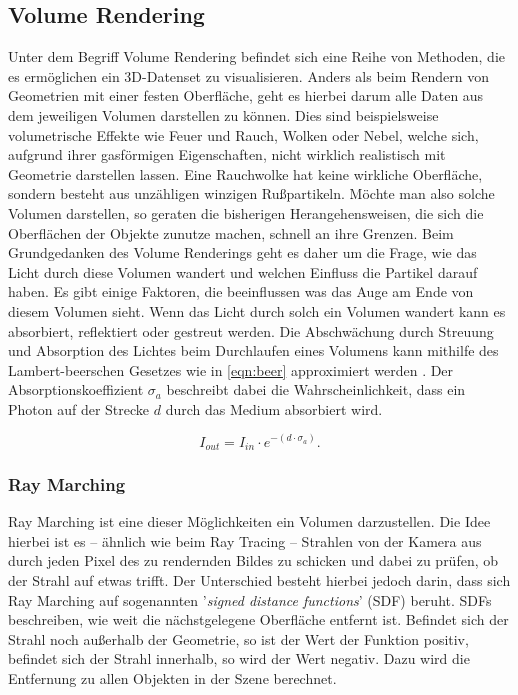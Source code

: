 \newpage
\subsection{Volume Rendering}

Unter dem Begriff Volume Rendering befindet sich eine Reihe von Methoden, die es ermöglichen ein 3D-Datenset zu visualisieren.
Anders als beim Rendern von Geometrien mit einer festen Oberfläche, geht es hierbei darum alle Daten aus
dem jeweiligen Volumen darstellen zu können. Dies sind beispielsweise volumetrische Effekte wie Feuer und Rauch, Wolken oder Nebel,
welche sich, aufgrund ihrer gasförmigen Eigenschaften, nicht wirklich realistisch mit Geometrie darstellen lassen.
Eine Rauchwolke hat keine wirkliche Oberfläche, sondern besteht aus unzähligen winzigen Rußpartikeln.
Möchte man also solche Volumen darstellen, so geraten die bisherigen Herangehensweisen, die sich die Oberflächen der Objekte zunutze machen,
schnell an ihre Grenzen. Beim Grundgedanken des Volume Renderings geht es daher um die Frage, wie das Licht durch diese Volumen
wandert und welchen Einfluss die Partikel darauf haben.
Es gibt einige Faktoren, die beeinflussen was das Auge am Ende von diesem Volumen sieht. Wenn das Licht durch solch ein Volumen wandert
kann es absorbiert, reflektiert oder gestreut werden.
Die Abschwächung durch Streuung und Absorption des Lichtes beim Durchlaufen eines Volumens kann mithilfe des Lambert-beerschen Gesetzes wie in \autoref{eqn:beer} 
approximiert werden \parencite{Mayerhofer2020}. 
Der Absorptionskoeffizient $\sigma_a$ beschreibt dabei die Wahrscheinlichkeit, dass ein Photon auf der Strecke $d$ durch das Medium absorbiert wird. 

\vspace{-0.5cm  }
\begin{equation} 
    \label{eqn:beer}
    I_{out} = I_{in} \cdot e^{- ( d \cdot\sigma_a  )}.
\end{equation}




\subsubsection{Ray Marching}

Ray Marching ist eine dieser Möglichkeiten ein Volumen darzustellen. Die Idee hierbei ist es – ähnlich wie beim Ray Tracing – 
Strahlen von der Kamera aus durch jeden Pixel des zu rendernden Bildes zu schicken und dabei zu prüfen, ob der Strahl auf etwas trifft.
Der Unterschied besteht hierbei jedoch darin, dass sich Ray Marching auf sogenannten '\textit{signed distance functions}' (SDF) beruht.
SDFs beschreiben, wie weit die nächstgelegene Oberfläche entfernt ist. Befindet sich der Strahl noch außerhalb der Geometrie, so ist 
der Wert der Funktion positiv, befindet sich der Strahl innerhalb, so wird der Wert negativ. Dazu wird die Entfernung zu allen Objekten 
in der Szene berechnet.

